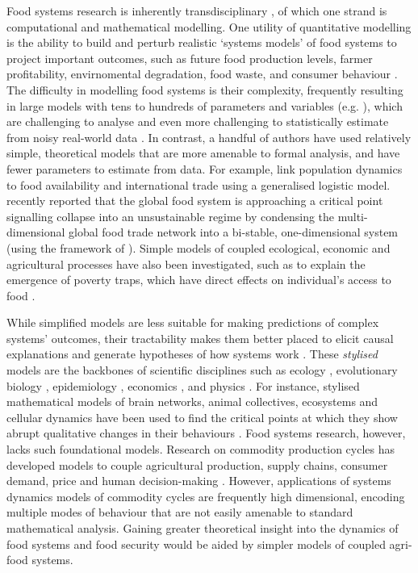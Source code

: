 \documentclass[12pt]{article}
\begin{document}
Food systems research is inherently transdisciplinary \cite{drimie2013,hammond2012}, of which one strand is computational and mathematical modelling. One utility of quantitative modelling is the ability to build and perturb realistic `systems models' of food systems to project important outcomes, such as future food production levels, farmer profitability, envirnomental degradation, food waste, and consumer behaviour \cite{springmann2018,marchand2016,sampedro2020,suweis2015,scalco2019,allen2016}. The difficulty in modelling food systems is their complexity, frequently resulting in large models with tens to hundreds of parameters and variables (e.g. \cite{sampedro2020,springmann2018}), which are challenging to analyse and even more challenging to statistically estimate from noisy real-world data \cite{sterman2000}. In contrast, a handful of authors have used relatively simple, theoretical models that are more amenable to formal analysis, and have fewer parameters to estimate from data. For example, \cite{suweis2015} link population dynamics to food availability and international trade using a generalised logistic model. \cite{tu2019} recently reported that the global food system is approaching a critical point signalling collapse into an unsustainable regime by condensing the multi-dimensional global food trade network into a bi-stable, one-dimensional system (using the framework of \cite{gao2016}). Simple models of coupled ecological, economic and agricultural processes have also been investigated, such as to explain the emergence of poverty traps, which have direct effects on individual's access to food \cite{ngonghala2017}.

While simplified models are less suitable for making predictions of complex systems' outcomes, their tractability makes them better placed to elicit causal explanations and generate hypotheses of how systems work \cite{smaldino2017,smaldino2019,otto2020}. These \textit{stylised} models are the backbones of scientific disciplines such as ecology \cite{may1973}, evolutionary biology \cite{boyd2003}, epidemiology \cite{kermack1927}, economics \cite{nerlove1958}, and physics \cite{strogatz1994}. For instance, stylised mathematical models of brain networks, animal collectives, ecosystems and cellular dynamics have been used to find the critical points at which they show abrupt qualitative changes in their behaviours \cite{sole1996,scheffer2001}. Food systems research, however, lacks such foundational models. Research on commodity production cycles has developed models to couple agricultural production, supply chains, consumer demand, price and human decision-making \cite{meadows1971,sterman2000}. However, applications of systems dynamics models of commodity cycles are frequently high dimensional, encoding multiple modes of behaviour that are not easily amenable to standard mathematical analysis. Gaining greater theoretical insight into the dynamics of food systems and food security would be aided by simpler models of coupled agri-food systems.
\end{document}
